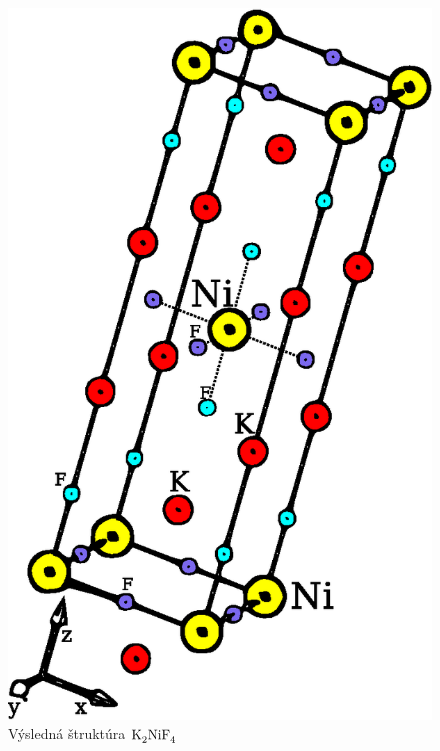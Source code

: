 \documentclass[a4paper, 10pt]{article}
\begin{document}
\begin{figure}[tb]
\centering
\includegraphics[scale=1.5]{data/vysl.eps}
\caption{ Výsledná štruktúra $\ce{K2NiF4}$ \label{image:vysl}}
\end{figure}
\end{document}
